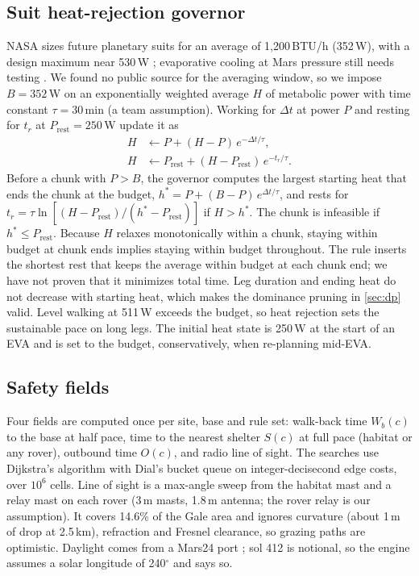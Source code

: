 \subsection{Suit heat-rejection governor}
\label{sec:heat}
NASA sizes future planetary suits for an average of 1,200\,BTU/h (352\,W), with a design maximum near 530\,W \citep{ogilvie2026marsmass,lobmeyer2025mxplss}; evaporative cooling at Mars pressure still needs testing \citep{ogilvie2026plss,bue2013hofi}. We found no public source for the averaging window, so we impose $B=352$\,W on an exponentially weighted average $H$ of metabolic power with time constant $\tau=30$\,min (a team assumption). Working for $\Delta t$ at power $P$ and resting for $t_r$ at $P_{\text{rest}}=250$\,W update it as
\begin{align}
  H &\leftarrow P + (H-P)\,e^{-\Delta t/\tau}, \nonumber\\
  H &\leftarrow P_{\text{rest}} + (H-P_{\text{rest}})\,e^{-t_r/\tau}.
\end{align}
Before a chunk with $P>B$, the governor computes the largest starting heat that ends the chunk at the budget, $h^\ast=P+(B-P)\,e^{\Delta t/\tau}$, and rests for $t_r=\tau\ln[(H-P_{\text{rest}})/(h^\ast-P_{\text{rest}})]$ if $H>h^\ast$. The chunk is infeasible if $h^\ast\le P_{\text{rest}}$. Because $H$ relaxes monotonically within a chunk, staying within budget at chunk ends implies staying within budget throughout. The rule inserts the shortest rest that keeps the average within budget at each chunk end; we have not proven that it minimizes total time. Leg duration and ending heat do not decrease with starting heat, which makes the dominance pruning in \cref{sec:dp} valid. Level walking at 511\,W exceeds the budget, so heat rejection sets the sustainable pace on long legs. The initial heat state is 250\,W at the start of an EVA and is set to the budget, conservatively, when re-planning mid-EVA.

\subsection{Safety fields}
\label{sec:fields}
Four fields are computed once per site, base and rule set: walk-back time $W_b(c)$ to the base at half pace, time to the nearest shelter $S(c)$ at full pace (habitat or any rover), outbound time $O(c)$, and radio line of sight. The searches use Dijkstra's algorithm \citep{dijkstra1959} with Dial's bucket queue \citep{dial1969} on integer-decisecond edge costs, over $10^6$ cells. Line of sight is a max-angle sweep from the habitat mast and a relay mast on each rover (3\,m masts, 1.8\,m antenna; the rover relay is our assumption). It covers 14.6\% of the Gale area and ignores curvature (about 1\,m of drop at 2.5\,km), refraction and Fresnel clearance, so grazing paths are optimistic. Daylight comes from a Mars24 port \citep{allison2000,allison1997}; sol 412 is notional, so the engine assumes a solar longitude of 240$^\circ$ and says so.

